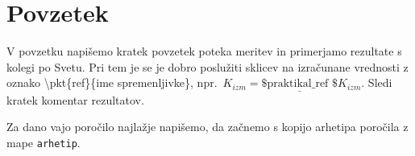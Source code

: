 \documentclass[12pt,a4paper]{article}
\newcommand\pkt[1]{\underline{\text{\$ praktikal\_{#1} \$ }}}
\begin{document}
\pagebreak
\section{Povzetek}
V povzetku napišemo kratek povzetek poteka meritev in primerjamo rezultate s kolegi po Svetu. Pri tem je se je dobro poslužiti sklicev na izračunane vrednosti z oznako \textbackslash{pkt}\{ref\}\{ime spremenljivke\}, npr.\ $K_{izm} = \pkt{ref}{K_{izm}}$. Sledi kratek komentar rezultatov.

Za dano vajo poročilo najlažje napišemo, da začnemo s kopijo arhetipa poročila z mape \texttt{arhetip}.
\end{document}
